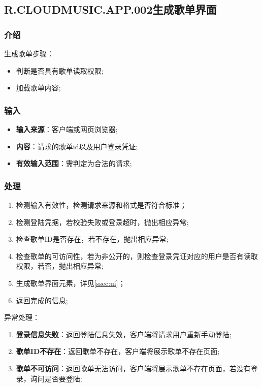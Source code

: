 \begin{enumerate}
\subsection{R.CLOUDMUSIC.APP.002生成歌单界面}
\subsubsection{介绍}
生成歌单步骤：
	\begin{itemize}
		\item 判断是否具有歌单读取权限;
		\item 加载歌单内容;
	\end{itemize}
\subsubsection{输入}
	\begin{itemize}
		\item \textbf{输入来源}：客户端或网页浏览器;
		\item \textbf{内容}：请求的歌单id以及用户登录凭证;
		\item \textbf{有效输入范围}：需判定为合法的请求;
	\end{itemize}
\subsubsection{处理}
	\begin{enumerate}
		\item 检测输入有效性，检测请求来源和格式是否符合标准；
		\item 检测登陆凭据，若校验失败或登录超时，抛出相应异常;
		\item 检查歌单ID是否存在，若不存在，抛出相应异常;
		\item 检查歌单的可访问性，若为非公开的，则检查登录凭证对应的用户是否有读取权限，若否，抛出相应异常;
		\item 生成歌单界面元素，详见\ref{ssec:ui}；
		\item 返回完成的信息;
	\end{enumerate}
	\noindent 异常处理：
	\begin{enumerate}
		\item \textbf{登录信息失败}：返回登陆信息失效，客户端将请求用户重新手动登陆;
		\item \textbf{歌单ID不存在}：返回歌单不存在，客户端将展示歌单不存在页面;
		\item \textbf{歌单不可访问}：返回歌单无法访问，客户端将展示歌单不存在页面，若没有登录，询问是否要登陆;
	\end{enumerate}

\end{enumerate}
